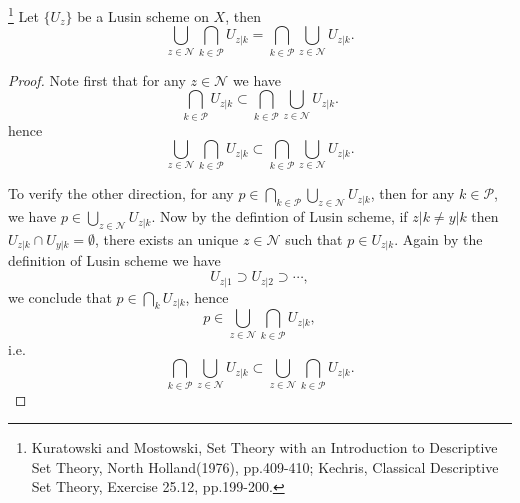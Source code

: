 \begin{lemma} \label{L:lusin}
\footnote{Kuratowski and Mostowski, Set Theory with an Introduction to
	Descriptive Set Theory, North Holland(1976), pp.409-410; 
    Kechris, Classical Descriptive Set Theory, Exercise 25.12, pp.199-200.
}
Let $\{U_z\}$ be a Lusin scheme on $X$, then 
\[
	\bigcup_{z\in\mathcal{N}} \bigcap_{k\in\mathcal{P}} U_{z|k}
	  =\bigcap_{k\in\mathcal{P}} \bigcup_{z\in\mathcal{N}} U_{z|k}.
\]
\end{lemma}
\begin{proof}
Note first that for any $z\in\mathcal{N}$ we have
\[
	\bigcap_{k\in\mathcal{P}} U_{z|k}
	  \subset\bigcap_{k\in\mathcal{P}} \bigcup_{z\in\mathcal{N}} U_{z|k}.
\]
hence
\[
	\bigcup_{z\in\mathcal{N}} \bigcap_{k\in\mathcal{P}} U_{z|k}
	  \subset\bigcap_{k\in\mathcal{P}} \bigcup_{z\in\mathcal{N}} U_{z|k}.
\]

To verify the other direction, for any 
$p\in\bigcap_{k\in\mathcal{P}} \bigcup_{z\in\mathcal{N}} U_{z|k}$, then
for any $k\in\mathcal{P}$, we have $p\in\bigcup_{z\in\mathcal{N}} U_{z|k}$.
Now by the defintion of Lusin scheme, if $z|k\neq y|k$ then 
$U_{z|k}\cap U_{y|k}=\emptyset$, there exists
an unique $z\in\mathcal{N}$ such that $p\in U_{z|k}$. Again by the definition
of Lusin scheme we have
\[
	U_{z|1} \supset U_{z|2} \supset \cdots,
\]
we conclude that $p\in\bigcap_k U_{z|k}$, hence
\[
	p\in\bigcup_{z\in\mathcal{N}} \bigcap_{k\in\mathcal{P}} U_{z|k},
\]
i.e.
\[
	\bigcap_{k\in\mathcal{P}} \bigcup_{z\in\mathcal{N}} U_{z|k}
	  \subset\bigcup_{z\in\mathcal{N}} \bigcap_{k\in\mathcal{P}} U_{z|k}.
\]
\end{proof}


